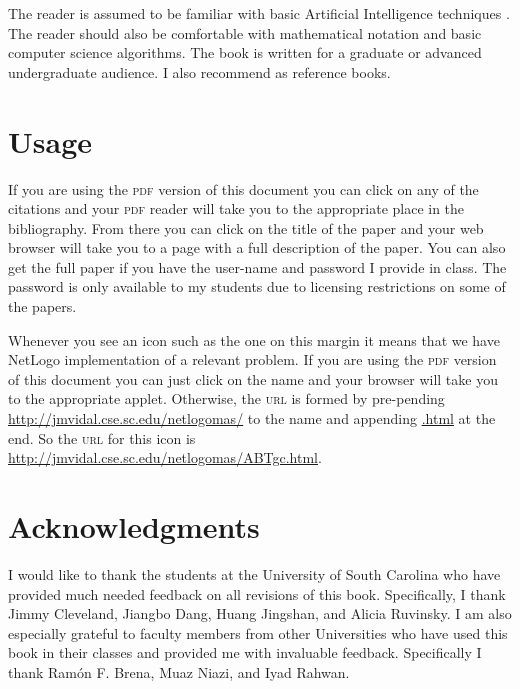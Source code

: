 The reader is assumed to be familiar with basic Artificial
Intelligence techniques \cite{russell03a}. The reader should also be
comfortable with mathematical notation and basic computer science
algorithms. The book is written for a graduate or advanced
undergraduate audience. I also recommend
\cite{mas-colell95a,osborne99a} as reference books.


\section{Usage}
\label{sec:usage}

If you are using the \textsc{pdf} version of this document you can
click on any of the citations and your \textsc{pdf} reader will take
you to the appropriate place in the bibliography. From there you can
click on the title of the paper and your web browser will take you to
a page with a full description of the paper. You can also get the full
paper if you have the user-name and password I provide in class. The
password is only available to my students due to licensing
restrictions on some of the papers.

Whenever you see an icon such as the one on this margin
 it means that we have NetLogo implementation of a
relevant problem. If you are using the \textsc{pdf} version of this
document you can just click on the name and your browser will take you
to the appropriate applet. Otherwise, the \textsc{url} is formed by
pre-pending \url{http://jmvidal.cse.sc.edu/netlogomas/} to the name
and appending \url{.html} at the end. So the \textsc{url} for this
icon is \url{http://jmvidal.cse.sc.edu/netlogomas/ABTgc.html}.


\section{Acknowledgments}

I would like to thank the students at the University of South Carolina
who have provided much needed feedback on all revisions of this book.
Specifically, I thank Jimmy Cleveland, Jiangbo Dang, Huang Jingshan,
and Alicia Ruvinsky. I am also especially grateful to faculty members
from other Universities who have used this book in their classes and
provided me with invaluable feedback. Specifically I thank Ram\'{o}n
F. Brena, Muaz Niazi, and Iyad Rahwan.




